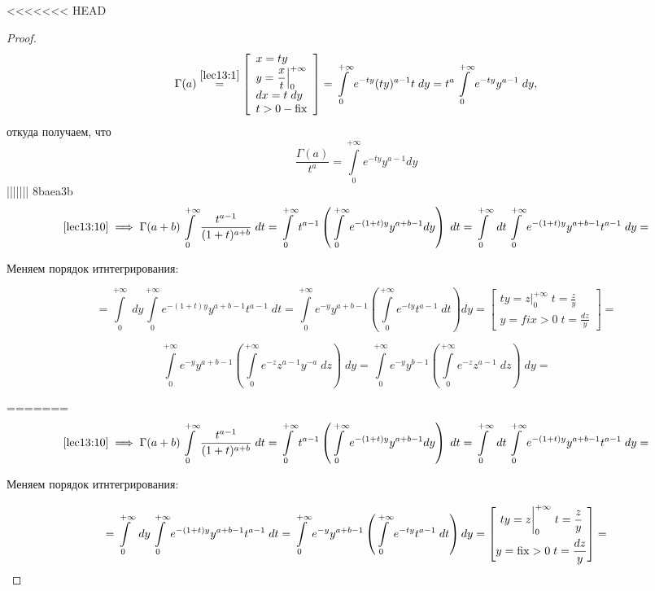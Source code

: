 \documentclass[../../main.tex]{subfiles}
\begin{document}
<<<<<<< HEAD
\begin{proof}
\[\Gamma(a) \stk{lec13:1}= \left[
\begin{array}{l}
  x=ty \\
  y = \dfrac{x}{t}\Big|^{+\infty}_0 \\
  dx = t\; dy \\
  t > 0 - \fix
\end{array}\right] = 
\int\limits_0^{+\infty}e^{-ty}(ty)^{a-1}t\;dy = t^a 
\int\limits_0^{+\infty}e^{-ty}y^{a-1}\;dy,\]
откуда получаем, что
\begin{equation}
  \label{lec13:9}
  \dfrac{\Gamma(a)}{t^a}=\int\limits_0^{+\infty}e^{-ty}y^{a-1}dy
\end{equation}
||||||| 8baea3b
\[ \eqref{lec13:10} \implies \Gamma (a+b) \int\limits_{0}^{+\infty} \frac{ t^{a-1} }{ (1+t)^{a+b} } \; dt = \int\limits_{0}^{+\infty} t^{a-1} \left(  \int\limits_{0}^{+\infty} e^{-(1+t)y } y^{a+b-1} dy \right) \; dt =  \int\limits_{0}^{+\infty} \; dt  \int\limits_{0}^{+\infty} e^{ -(1+t)y } y^{a+b-1}  t^{a-1} \; dy = \]

Меняем порядок итнтегрирования:

\[ =  \int\limits_{0}^{+\infty} \; dy \int\limits_{0}^{+\infty} e^{ -(1+t)y } y^{a+b-1} t^{a-1} \; dt  = \int\limits_{0}^{+\infty} e^{-y} y^{a+b-1} \left( \int\limits_{0}^{+\infty} e^{-ty} t^{a-1} \; dt \right) dy = \left[  \begin{gathered}
									ty = z \bigg|_{0}^{+\infty} \; t = \frac{z}{y}\\
									y = fix > 0 \; t = \frac{dz}{y} 
										\end{gathered} \right] =   \]

\[  \int\limits_{0}^{+\infty} e^{-y} y^{a+b-1} \left( \int\limits_{0}^{+\infty} e^{-z} z^{a-1} y^{-a}  \; dz   \right) \; dy = \int\limits_{0}^{+\infty} e^{-y} y^{b-1} \left( \int\limits_{0}^{+\infty} e^{-z} z^{a-1}  \; dz \right) \; dy  =  \]

=======
\[ \eqref{lec13:10} \implies \Gamma (a+b) \int\limits_{0}^{+\infty} \frac{ 
t^{a-1} }{ (1+t)^{a+b} } \; dt = \int\limits_{0}^{+\infty} t^{a-1} \left(  
\int\limits_{0}^{+\infty} e^{-(1+t)y } y^{a+b-1} dy \right) \; dt =  
\int\limits_{0}^{+\infty} \; dt  \int\limits_{0}^{+\infty} e^{ -(1+t)y } 
y^{a+b-1}  t^{a-1} \; dy = \]

Меняем порядок итнтегрирования:

\[ =  \int\limits_{0}^{+\infty} \; dy \int\limits_{0}^{+\infty} e^{ -(1+t)y } 
y^{a+b-1} t^{a-1} \; dt  = \int\limits_{0}^{+\infty} e^{-y} y^{a+b-1} \left( 
\int\limits_{0}^{+\infty} e^{-ty} t^{a-1} \; dt \right) dy = \left[  
\begin{gathered}
									ty = z \bigg|_{0}^{+\infty} \; t = \frac{z}{y}\\
									y = \operatorname{fix} > 0 \; t = \frac{dz}{y} 
										\end{gathered} \right] =   \]


\end{proof}
\end{document}
